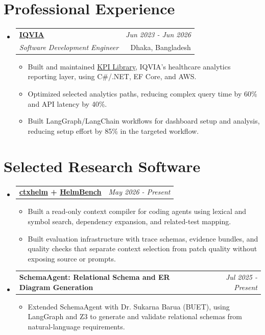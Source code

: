 \documentclass[a4paper,11pt]{article}
\makeatletter
\newcommand{\resumeSubheading}[4]{
\vspace{0.5mm}\item
    \begin{tabular*}{0.98\textwidth}[t]{l@{\extracolsep{\fill}}r}
        \textbf{#1} & \textit{\small{#4}} \\
        \textit{\small{#3}} &  \small{#2}\\
    \end{tabular*}
    \vspace{-2.4mm}
}
\newcommand{\resumeSubHeadingListStart}{\begin{itemize}[leftmargin=*,labelsep=1mm]}
\newcommand{\resumeItemListStart}{\begin{itemize}[leftmargin=*,labelsep=1mm,itemsep=0.5mm]}
\newcommand{\resumeSubHeadingListEnd}{\end{itemize}\vspace{2mm}}
\newcommand{\resumeItemListEnd}{\end{itemize}\vspace{-2mm}}
\newcommand{\resumeCompactProject}[2]{
\vspace{0.5mm}\item
    \begin{tabularx}{0.98\linewidth}[t]{@{}>{\raggedright\arraybackslash}X@{\hspace{1em}}r@{}}
        \textbf{#1} & \textit{\small #2}
    \end{tabularx}
    \vspace{-2.4mm}
}
\makeatother
\begin{document}
\section{\textbf{Professional Experience}}
\resumeSubHeadingListStart
\resumeSubheading
{\href{https://www.iqvia.com/}{IQVIA}}{Dhaka, Bangladesh}
{Software Development Engineer}{Jun 2023 - Jun 2026}
\resumeItemListStart
\item Built and maintained \href{https://www.iqvia.com/library/fact-sheets/kpi-library}{KPI Library}, IQVIA's healthcare analytics reporting layer, using C\#/.NET, EF Core, and AWS.
\item Optimized selected analytics paths, reducing complex query time by 60\% and API latency by 40\%.
\item Built LangGraph/LangChain workflows for dashboard setup and analysis, reducing setup effort by 85\% in the targeted workflow.
\resumeItemListEnd
\resumeSubHeadingListEnd
\vspace{-4mm}

\section{\textbf{Selected Research Software}}
\resumeSubHeadingListStart
\resumeCompactProject
{\href{https://github.com/thromel/ctxhelm}{ctxhelm} + \href{https://github.com/thromel/helmbench}{HelmBench}}
{May 2026 - Present}
\resumeItemListStart
\item Built a read-only context compiler for coding agents using lexical and symbol search, dependency expansion, and related-test mapping.
\item Built evaluation infrastructure with trace schemas, evidence bundles, and quality checks that separate context selection from patch quality without exposing source or prompts.
\resumeItemListEnd
\resumeCompactProject
{SchemaAgent: Relational Schema and ER Diagram Generation}
{Jul 2025 - Present}
\resumeItemListStart
\item Extended SchemaAgent with Dr. Sukarna Barua (BUET), using LangGraph and Z3 to generate and validate relational schemas from natural-language requirements.
\resumeItemListEnd
\resumeSubHeadingListEnd
\vspace{-4mm}
\end{document}
